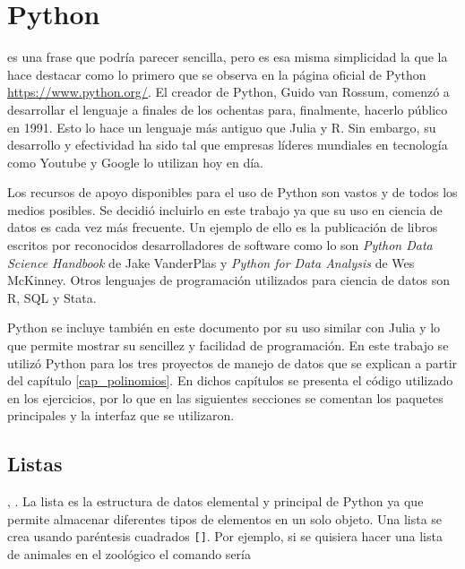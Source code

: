 \chapter{Python} \label{cap_python}

 es una frase que podría parecer sencilla, pero es esa misma simplicidad la que la hace destacar como lo primero que se observa en la página oficial de \textsf{Python} \url{https://www.python.org/}. El creador de \textsf{Python}, Guido van Rossum, comenzó a desarrollar el lenguaje a finales de los ochentas para, finalmente, hacerlo público en 1991. Esto lo hace un lenguaje más antiguo que \textsf{Julia} y \textsf{R}. Sin embargo, su desarrollo y efectividad ha sido tal que empresas líderes mundiales en tecnología como Youtube y Google lo utilizan hoy en día. 

Los recursos de apoyo disponibles para el uso de \textsf{Python} son vastos y de todos los medios posibles. Se decidió incluirlo en este trabajo ya que su uso en ciencia de datos es cada vez más frecuente. Un ejemplo de ello es la publicación de libros escritos por reconocidos desarrolladores de software como lo son \textit{Python Data Science Handbook} de Jake VanderPlas y \textit{Python for Data Analysis} de Wes McKinney. Otros lenguajes de programación utilizados para ciencia de datos son \textsf{R, SQL} y \textsf{Stata}. 

\textsf{Python} se incluye también en este documento por su uso similar con \textsf{Julia} y  lo que permite mostrar su sencillez y facilidad de programación. En este trabajo se utilizó \textsf{Python} para los tres proyectos de manejo de datos que se explican a partir del capítulo \ref{cap_polinomios}. En dichos capítulos se presenta el código utilizado en los ejercicios, por lo que en las siguientes secciones se comentan los paquetes principales y la interfaz que se utilizaron. 

\section{Listas}
, \cite{matthes2019python}. La lista es la estructura de datos elemental y principal de \textsf{Python} ya que permite almacenar diferentes tipos de elementos en un solo objeto. Una lista se crea usando paréntesis cuadrados \texttt{[]}. Por ejemplo, si se quisiera hacer una lista de animales en el zoológico el comando sería 

